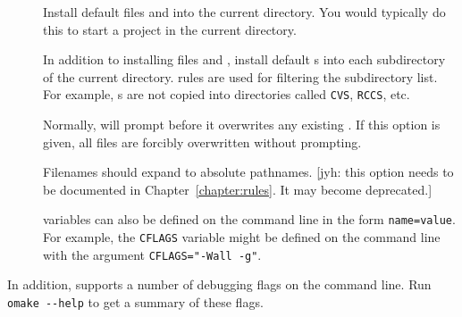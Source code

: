 \begin{description}
\item[] Install default files  and  into the current
  directory.  You would typically do this to start a project in the current directory.

\item[] In addition to installing files  and ,
  install default s into each subdirectory of the current directory.
   rules are used for filtering the subdirectory list.  For example, s
  are not copied into directories called \verb+CVS+, \verb+RCCS+, etc.

\item[] Normally,  will prompt before it overwrites any
  existing .  If this option is given, all files are forcibly overwritten
  without prompting.

\item[] Filenames should expand to absolute pathnames.  [jyh: this option needs to
be documented in Chapter~\ref{chapter:rules}.  It may become deprecated.]

\item[]  variables can also be defined on the command
  line in the form \verb+name=value+.  For example, the \verb+CFLAGS+ variable might be defined
  on the command line with the argument \verb+CFLAGS="-Wall -g"+.
\end{description}

In addition,  supports a number of debugging flags on the command line. Run
\verb+omake --help+ to get a summary of these flags.

